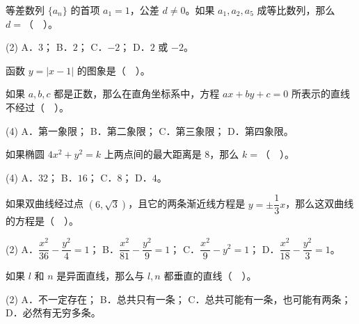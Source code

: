 \begin{question}
等差数列 $\{a_n\}$ 的首项 $a_1=1$，公差 $d\ne0$。如果 $a_1,a_2,a_5$ 成等比数列，那么 $d=$（　）。

\begin{gkopts}(2)
\task A．$3$；
\task B．$2$；
\task C．$-2$；
\task D．$2$ 或 $-2$。
\end{gkopts}

\Needspace{0.4\textheight}
\end{question}
\begin{question}
函数 $y=|x-1|$ 的图象是（　）。
\nopagebreak[4]
\begin{center}\end{center}
\nopagebreak[4]
\end{question}
\begin{question}
如果 $a,b,c$ 都是正数，那么在直角坐标系中，方程 $ax+by+c=0$ 所表示的直线不经过（　）。

\begin{gkopts}(4)
\task A．第一象限；
\task B．第二象限；
\task C．第三象限；
\task D．第四象限。
\end{gkopts}

\end{question}
\begin{question}
如果椭圆 $4x^2+y^2=k$ 上两点间的最大距离是 $8$，那么 $k=$（　）。

\begin{gkopts}(4)
\task A．$32$；
\task B．$16$；
\task C．$8$；
\task D．$4$。
\end{gkopts}

\end{question}
\begin{question}
如果双曲线经过点 $(6,\sqrt3)$，且它的两条渐近线方程是 $y=\pm\dfrac13x$，那么这双曲线的方程是（　）。

\begin{gkopts}(2)
\task A．$\dfrac{x^2}{36}-\dfrac{y^2}{4}=1$；
\task B．$\dfrac{x^2}{81}-\dfrac{y^2}{9}=1$；
\task C．$\dfrac{x^2}{9}-y^2=1$；
\task D．$\dfrac{x^2}{18}-\dfrac{y^2}{3}=1$。
\end{gkopts}

\end{question}
\begin{question}
如果 $l$ 和 $n$ 是异面直线，那么与 $l,n$ 都垂直的直线（　）。

\begin{gkopts}(2)
\task A．不一定存在；
\task B．总共只有一条；
\task C．总共可能有一条，也可能有两条；
\task D．必然有无穷多条。
\end{gkopts}

\end{question}
